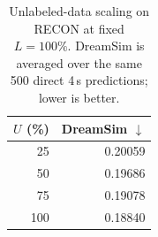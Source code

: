 \begin{table}[t]
\centering
\caption{Unlabeled-data scaling on RECON at fixed $L=100\%$. DreamSim is averaged over the same 500 direct 4\,s predictions; lower is better.}
\label{tab:data_scaling_recon_u}
\begin{tabular}{rr}
\toprule
$U$ (\%) & DreamSim $\downarrow$ \\
\midrule
25 & 0.20059 \\
50 & 0.19686 \\
75 & 0.19078 \\
100 & 0.18840 \\
\bottomrule
\end{tabular}
\end{table}
